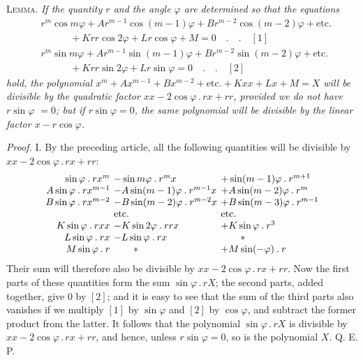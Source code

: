 \textsc{Lemma.} \textit{If the quantity $r$ and the angle $\varphi$ are determined so that the equations}
\[
\begin{aligned}
&r^m\cos m\varphi+Ar^{m-1}\cos(m-1)\varphi+Br^{m-2}\cos(m-2)\varphi+\text{etc.}\\
&\hspace{3em}+Krr\cos2\varphi+Lr\cos\varphi+M=0\quad.\quad.\quad[1]\\
&r^m\sin m\varphi+Ar^{m-1}\sin(m-1)\varphi+Br^{m-2}\sin(m-2)\varphi+\text{etc.}\\
&\hspace{3em}+Krr\sin2\varphi+Lr\sin\varphi=0\quad.\quad.\quad[2]
\end{aligned}
\]
\textit{hold, the polynomial $x^m+Ax^{m-1}+Bx^{m-2}+\text{etc.}+Kxx+Lx+M=X$ will be divisible by the quadratic factor $xx-2\cos\varphi\mathbin{.}rx+rr$, provided we do not have $r\sin\varphi$ $=0$; but if $r\sin\varphi=0$, the same polynomial will be divisible by the linear factor $x-r\cos\varphi$.}

\textit{Proof.} I. By the preceding article, all the following quantities will be divisible by $xx-2\cos\varphi\mathbin{.}rx+rr$:
{\small
\[
\setlength{\arraycolsep}{2pt}
\begin{array}{rll}
\sin\varphi\mathbin{.}rx^m&-\sin m\varphi\mathbin{.}r^m x&+\sin(m-1)\varphi\mathbin{.}r^{m+1}\\
A\sin\varphi\mathbin{.}rx^{m-1}&-A\sin(m-1)\varphi\mathbin{.}r^{m-1}x&+A\sin(m-2)\varphi\mathbin{.}r^m\\
B\sin\varphi\mathbin{.}rx^{m-2}&-B\sin(m-2)\varphi\mathbin{.}r^{m-2}x&+B\sin(m-3)\varphi\mathbin{.}r^{m-1}\\
&\text{etc.}&\text{etc.}\\
K\sin\varphi\mathbin{.}rxx&-K\sin2\varphi\mathbin{.}rrx&+K\sin\varphi\mathbin{.}r^3\\
L\sin\varphi\mathbin{.}rx&-L\sin\varphi\mathbin{.}rx&\qquad *\\
M\sin\varphi\mathbin{.}r&\qquad *&+M\sin(-\varphi)\mathbin{.}r
\end{array}
\]
}
Their sum will therefore also be divisible by $xx-2\cos\varphi\mathbin{.}rx+rr$. Now the first parts of these quantities form the sum $\sin\varphi\mathbin{.}rX$; the second parts, added together, give $0$ by $[2]$; and it is easy to see that the sum of the third parts also vanishes if we multiply $[1]$ by $\sin\varphi$ and $[2]$ by $\cos\varphi$, and subtract the former product from the latter. It follows that the polynomial $\sin\varphi\mathbin{.}rX$ is divisible by $xx-2\cos\varphi\mathbin{.}rx+rr$, and hence, unless $r\sin\varphi=0$, so is the polynomial $X$. Q. E. P.

